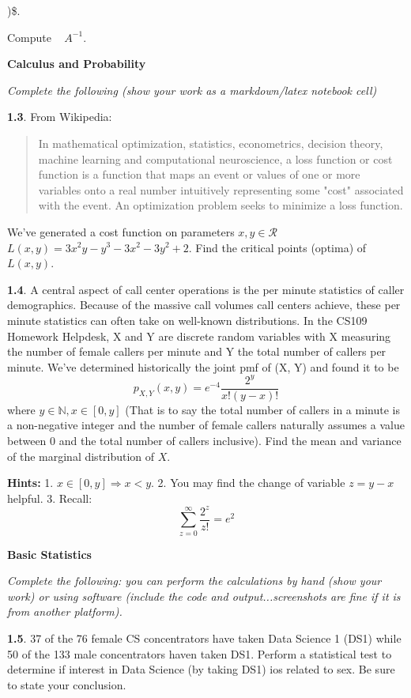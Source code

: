 \documentclass[11pt]{article}
\begin{document}
\right)\$.

Compute ~ \(A^{-1}\).

    \textbf{Calculus and Probability}

\emph{Complete the following (show your work as a markdown/latex
notebook cell)}

\textbf{1.3}. From Wikipedia:

\begin{quote}
In mathematical optimization, statistics, econometrics, decision theory,
machine learning and computational neuroscience, a loss function or cost
function is a function that maps an event or values of one or more
variables onto a real number intuitively representing some "cost"
associated with the event. An optimization problem seeks to minimize a
loss function.
\end{quote}

We've generated a cost function on parameters \(x,y \in \mathcal{R}\)
\(L(x,y)= 3x^2y - y^3 - 3x^2 - 3y^2 + 2\). Find the critical points
(optima) of \(L(x,y)\).

\textbf{1.4}. A central aspect of call center operations is the per
minute statistics of caller demographics. Because of the massive call
volumes call centers achieve, these per minute statistics can often take
on well-known distributions. In the CS109 Homework Helpdesk, X and Y are
discrete random variables with X measuring the number of female callers
per minute and Y the total number of callers per minute. We've
determined historically the joint pmf of (X, Y) and found it to be
\[p_{X,Y}(x,y) = e^{-4}\frac{2^y}{x!(y-x)!}\] where
\(y \in \mathbb{N}, x \in [0, y]\) (That is to say the total number of
callers in a minute is a non-negative integer and the number of female
callers naturally assumes a value between 0 and the total number of
callers inclusive). Find the mean and variance of the marginal
distribution of \(X\).

\textbf{Hints: } 1. \(x \in \left[0,y\right] \Rightarrow x < y\). 2. You
may find the change of variable \(z = y-x\) helpful. 3. Recall:
\[ \sum_{z=0}^{\infty}\frac{2^{z}}{z!}  =e^{2}\]

    \textbf{Basic Statistics}

\emph{Complete the following: you can perform the calculations by hand
(show your work) or using software (include the code and
output...screenshots are fine if it is from another platform).}

\textbf{1.5}. 37 of the 76 female CS concentrators have taken Data
Science 1 (DS1) while 50 of the 133 male concentrators haven taken DS1.
Perform a statistical test to determine if interest in Data Science (by
taking DS1) ios related to sex. Be sure to state your conclusion.
\end{document}
